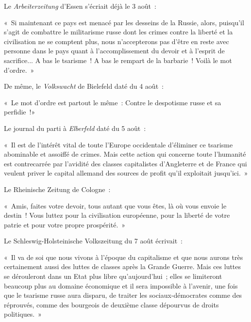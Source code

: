 \documentclass[french,twoside]{book} %
\newenvironment{quoteblock}%
  {\begin{quoting}}
  {\end{quoting}}
\newenvironment{quotebar}{%
    \def\FrameCommand{{\color{rubric!10!}\vrule width 0.5em} \hspace{0.9em}}%
    \def\OuterFrameSep{\itemsep} %
    \MakeFramed {\advance\hsize-\width \FrameRestore}
  }%
  {%
    \endMakeFramed
  }
\renewenvironment{quoteblock}%
  {%
    \savenotes
    \setstretch{0.9}
    \normalfont
    \begin{quotebar}
  }
  {%
    \end{quotebar}
    \spewnotes
  }
\begin{document}
\noindent Le \emph{Arbeiterzeitung} d’Essen s’écriait déjà le 3 août :\par

\begin{quoteblock}
 \noindent « Si maintenant ce pays est menacé par les desseins de la Russie, alors, puisqu’il s’agit de combattre le militarisme russe dont les crimes contre la liberté et la civilisation ne se comptent plus, nous n’accepterons pas d’être en reste avec personne dans le pays quant à l’accomplissement du devoir et à l’esprit de sacrifice... A bas le tsarisme ! A bas le rempart de la barbarie ! Voilà le mot d’ordre. »\par
 De même, le \emph{Volkswacht} de Bielefeld daté du 4 août :\par
 « Le mot d’ordre est partout le même : Contre le despotisme russe et sa perfidie !»
\end{quoteblock}

\noindent Le journal du parti à \emph{Elberfeld} daté du 5 août :\par

\begin{quoteblock}
 \noindent « Il est de l’intérêt vital de toute l’Europe occidentale d’éliminer ce tsarisme abominable et assoiffé de crimes. Mais cette action qui concerne toute l’humanité est contrecarrée par l’avidité des classes capitalistes d’Angleterre et de France qui veulent priver le capital allemand des sources de profit qu’il exploitait jusqu’ici. »
\end{quoteblock}

\noindent Le Rheinische Zeitung de Cologne :\par

\begin{quoteblock}
 \noindent « Amis, faites votre devoir, tous autant que vous êtes, là où vous envoie le destin ! Vous luttez pour la civilisation européenne, pour la liberté de votre patrie et pour votre propre prospérité. »
\end{quoteblock}

\noindent Le Schleswig-Holsteinische Volkszeitung du 7 août écrivait :\par

\begin{quoteblock}
 \noindent « Il va de soi que nous vivons à l’époque du capitalisme et que nous aurons très certainement aussi des luttes de classes après la Grande Guerre. Mais ces luttes se dérouleront dans un Etat plus libre qu’aujourd’hui ; elles se limiteront beaucoup plus au domaine économique et il sera impossible à l’avenir, une fois que le tsarisme russe aura disparu, de traiter les sociaux-démocrates comme des réprouvés, comme des bourgeois de deuxième classe dépourvus de droits politiques. »
\end{quoteblock}
\end{document}
